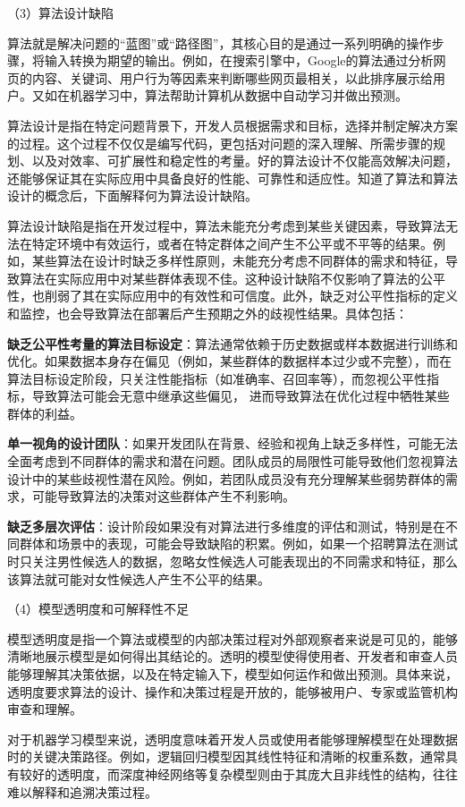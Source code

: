 （3）算法设计缺陷

算法就是解决问题的“蓝图”或“路径图”，其核心目的是通过一系列明确的操作步骤，将输入转换为期望的输出。例如，在搜索引擎中，Google的算法通过分析网页的内容、关键词、用户行为等因素来判断哪些网页最相关，以此排序展示给用户。又如在机器学习中，算法帮助计算机从数据中自动学习并做出预测。

算法设计是指在特定问题背景下，开发人员根据需求和目标，选择并制定解决方案的过程。这个过程不仅仅是编写代码，更包括对问题的深入理解、所需步骤的规划、以及对效率、可扩展性和稳定性的考量。好的算法设计不仅能高效解决问题，还能够保证其在实际应用中具备良好的性能、可靠性和适应性。知道了算法和算法设计的概念后，下面解释何为算法设计缺陷。

算法设计缺陷是指在开发过程中，算法未能充分考虑到某些关键因素，导致算法无法在特定环境中有效运行，或者在特定群体之间产生不公平或不平等的结果。例如，某些算法在设计时缺乏多样性原则，未能充分考虑不同群体的需求和特征，导致算法在实际应用中对某些群体表现不佳。这种设计缺陷不仅影响了算法的公平性，也削弱了其在实际应用中的有效性和可信度。此外，缺乏对公平性指标的定义和监控，也会导致算法在部署后产生预期之外的歧视性结果。具体包括：

\textbf{缺乏公平性考量的算法目标设定}：算法通常依赖于历史数据或样本数据进行训练和优化。如果数据本身存在偏见（例如，某些群体的数据样本过少或不完整），而在算法目标设定阶段，只关注性能指标（如准确率、召回率等），而忽视公平性指标，导致算法可能会无意中继承这些偏见， 进而导致算法在优化过程中牺牲某些群体的利益。

\textbf{单一视角的设计团队}：如果开发团队在背景、经验和视角上缺乏多样性，可能无法全面考虑到不同群体的需求和潜在问题。团队成员的局限性可能导致他们忽视算法设计中的某些歧视性潜在风险。例如，若团队成员没有充分理解某些弱势群体的需求，可能导致算法的决策对这些群体产生不利影响。

\textbf{缺乏多层次评估}：设计阶段如果没有对算法进行多维度的评估和测试，特别是在不同群体和场景中的表现，可能会导致缺陷的积累。例如，如果一个招聘算法在测试时只关注男性候选人的数据，忽略女性候选人可能表现出的不同需求和特征，那么该算法就可能对女性候选人产生不公平的结果。

（4）模型透明度和可解释性不足

模型透明度是指一个算法或模型的内部决策过程对外部观察者来说是可见的，能够清晰地展示模型是如何得出其结论的。透明的模型使得使用者、开发者和审查人员能够理解其决策依据，以及在特定输入下，模型如何运作和做出预测。具体来说，透明度要求算法的设计、操作和决策过程是开放的，能够被用户、专家或监管机构审查和理解。

对于机器学习模型来说，透明度意味着开发人员或使用者能够理解模型在处理数据时的关键决策路径。例如，逻辑回归模型因其线性特征和清晰的权重系数，通常具有较好的透明度，而深度神经网络等复杂模型则由于其庞大且非线性的结构，往往难以解释和追溯决策过程。

